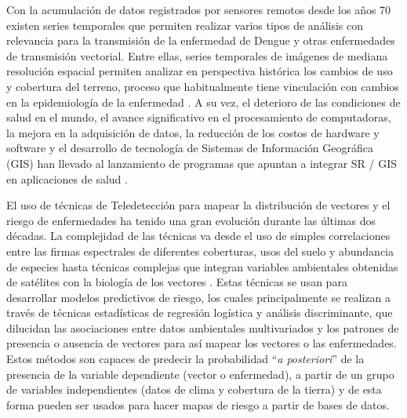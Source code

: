 \par Con la acumulación de datos registrados por sensores remotos desde los años
  70 existen series temporales que permiten realizar varios tipos de análisis con
  relevancia para la transmisión de la enfermedad de Dengue y otras
  enfermedades de transmisión vectorial.
  Entre ellas, series temporales de imágenes de mediana resolución espacial
  permiten analizar en perspectiva histórica los cambios de uso y cobertura del
  terreno, proceso que habitualmente tiene vinculación con cambios en la
  epidemiología de la enfermedad \cite{german_temporal}.
  A su vez, el deterioro de las condiciones de salud en el mundo, el avance significativo
  en el procesamiento de computadoras, la mejora en la adquisición de datos,
  la reducción de los costos de hardware y software y el desarrollo de tecnología
  de Sistemas de Información Geográfica (GIS) han llevado al lanzamiento
  de programas que apuntan a integrar SR / GIS en aplicaciones de salud
  \cite{tesis_riesgo_viral, tesis_gonza, espinosa_temporal, rs_public_health}.



\par El uso de técnicas de Teledetección para mapear la distribución de vectores y el riesgo
  de enfermedades ha tenido una gran evolución durante las últimas dos
  décadas. La complejidad de las técnicas va desde el uso de simples
  correlaciones entre las firmas espectrales de diferentes coberturas, usos del
  suelo y abundancia de especies \cite{spectral_spatial, potencial_use} hasta
  técnicas complejas que integran variables
  ambientales obtenidas de satélites con la biología de los vectores
  \cite{ndwi_erffectiveness, malaria_impact}.
  Estas técnicas se usan para desarrollar modelos predictivos de riesgo,
  los cuales principalmente se realizan a través de técnicas estadísticas de
  regresión logística y análisis discriminante, que dilucidan las asociaciones
  entre datos ambientales multivariados y los patrones de presencia o ausencia de
  vectores para así mapear los vectores o las enfermedades.
  Estos métodos son capaces de predecir la probabilidad “\textit{a posteriori}” de la
  presencia de la variable dependiente (vector o enfermedad), a partir de un
  grupo de variables independientes (datos de clima y cobertura de la tierra) y de esta
  forma pueden ser usados para hacer mapas de riesgo a partir de bases de datos.



